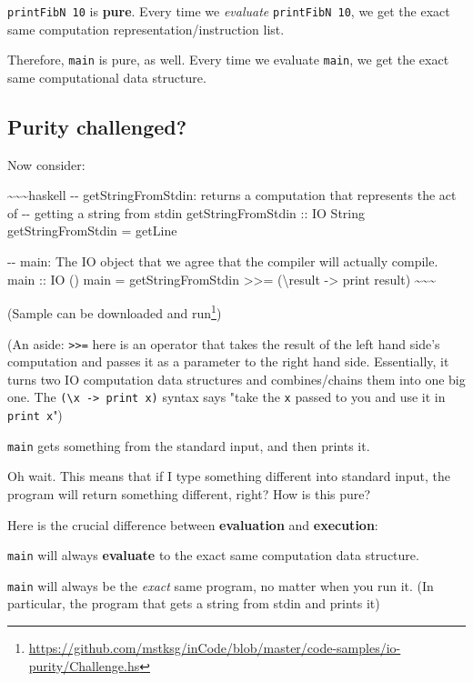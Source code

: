 \documentclass[]{article}
\renewcommand{\href}[2]{#2\footnote{\url{#1}}}
\begin{document}
\texttt{printFibN\ 10} is \textbf{pure}. Every time we \emph{evaluate}
\texttt{printFibN\ 10}, we get the exact same computation
representation/instruction list.

Therefore, \texttt{main} is pure, as well. Every time we evaluate \texttt{main},
we get the exact same computational data structure.

\subsection{Purity challenged?}

Now consider:

\textasciitilde{}\textasciitilde{}\textasciitilde{}haskell -\/-
getStringFromStdin: returns a computation that represents the act of -\/-
getting a string from stdin getStringFromStdin :: IO String getStringFromStdin =
getLine

-\/- main: The IO object that we agree that the compiler will actually compile.
main :: IO () main = getStringFromStdin \textgreater{}\textgreater{}=
(\textbackslash{}result -\textgreater{} print result)
\textasciitilde{}\textasciitilde{}\textasciitilde{}

(Sample can be
\href{https://github.com/mstksg/inCode/blob/master/code-samples/io-purity/Challenge.hs}{downloaded
and run})

(An aside: \texttt{\textgreater{}\textgreater{}=} here is an operator that takes
the result of the left hand side's computation and passes it as a parameter to
the right hand side. Essentially, it turns two IO computation data structures
and combines/chains them into one big one. The
\texttt{(\textbackslash{}x\ -\textgreater{}\ print\ x)} syntax says "take the
\texttt{x} passed to you and use it in \texttt{print\ x}")

\texttt{main} gets something from the standard input, and then prints it.

Oh wait. This means that if I type something different into standard input, the
program will return something different, right? How is this pure?

Here is the crucial difference between \textbf{evaluation} and
\textbf{execution}:

\texttt{main} will always \textbf{evaluate} to the exact same computation data
structure.

\texttt{main} will always be the \emph{exact} same program, no matter when you
run it. (In particular, the program that gets a string from stdin and prints it)
\end{document}
